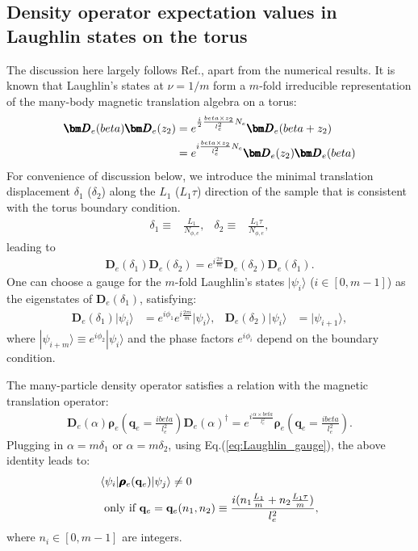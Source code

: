 \begin{subappendices}
\section{Density operator expectation values in Laughlin states on the torus}\label{app:density_expectation}
The discussion here largely follows Ref.\cite{wen1990ground}, apart from the numerical results. It is known that Laughlin's states at $\nu=1/m$ form a $m$-fold irreducible representation of the many-body magnetic translation algebra on a torus:
\begin{align}
\pmb{\bm D}_e(beta)\pmb{\bm D}_e(z_2)&=e^{\frac{i}{2} \frac{beta\times z_2}{l_e^2} N_e}\pmb{\bm D}_e(beta+z_2)\notag\\
&=e^{i \frac{beta\times z_2}{l_e^2} N_e} \pmb{\bm D}_e(z_2)\pmb{\bm D}_e(beta)
\end{align}
For convenience of discussion below, we introduce the minimal translation displacement $\delta_1$ ($\delta_2$) along the $L_1$ ($L_1\tau$) direction of the sample that is consistent with the torus boundary condition. 
\begin{align}
\delta_1\equiv&\frac{L_{1}}{N_{\phi,e}},&\delta_2\equiv&\frac{L_{1}\tau}{N_{\phi,e}}, 
\end{align}
leading to
\begin{align}
\pmb{\bm D}_e(\delta_1)\pmb{\bm D}_e(\delta_2)=e^{i\frac{2\pi}{m}}\pmb{\bm D}_e(\delta_2)\pmb{\bm D}_e(\delta_1).
\end{align}
One can choose a gauge for the $m$-fold Laughlin's states $|\psi_i\rangle$ ($i \in [0,m-1]$) as the eigenstates of $\pmb{\bm D}_e(\delta_1)$, satisfying:
\begin{align}
\pmb{\bm D}_e(\delta_1)|\psi_i\rangle&=e^{i\phi_1}e^{i\frac{2\pi i}{m}}|\psi_i\rangle, & \pmb{\bm D}_e(\delta_2)|\psi_i\rangle&=|\psi_{i+1}\rangle,\label{eq:Laughlin_gauge}
\end{align}
where $|\psi_{i+m}\rangle\equiv e^{i\phi_2}|\psi_{i}\rangle$ and the phase factors $e^{i\phi_i}$ depend on the boundary condition. 

The many-particle density operator satisfies a relation with the magnetic translation operator:
\begin{align}
\pmb{\bm D}_e(\alpha) \pmb{\boldsymbol\rho}_e(\mathbf q_e=\frac{ibeta}{l_e^2}) \pmb{\bm D}_e(\alpha)^\dagger=e^{i\frac{\alpha\times beta}{l_e^2}}\pmb{\boldsymbol\rho}_e(\mathbf q_e=\frac{ibeta}{l_e^2}).
\end{align}
Plugging in $\alpha=m\delta_1$ or $\alpha=m\delta_2$, using Eq.(\ref{eq:Laughlin_gauge}), the above identity leads to:
\begin{align}
&\langle \psi_i|\pmb{\boldsymbol\rho}_e(\mathbf q_e)|\psi_j\rangle\neq 0 \notag\\
&\text{ only if } \mathbf q_e=\mathbf q_e(n_1,n_2)\equiv\frac{i (n_1 \frac{L_1}{m}+ n_2\frac{L_1\tau}{m})}{l_e^2},
\end{align}
where $n_i\in [0,m-1]$ are integers. 


\end{subappendices}
